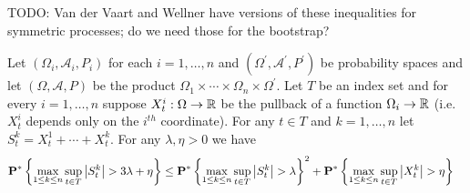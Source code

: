 TODO: Van der Vaart and Wellner have versions of these inequalities for symmetric processes; do we need those for the bootstrap?
\begin{lem}\label{HoffmanJorgensenInequalities}Let $(\Omega_i,\mathcal{A}_i, P_i)$ for each $i=1, \dotsc, n$ and $(\Omega^\prime, \mathcal{A}^\prime, P^\prime)$ be probability spaces and let $(\Omega, \mathcal{A}, P)$ be the product $\Omega_1 \times \dotsb \times \Omega_n \times \Omega^\prime$.  Let $T$ be an index set and for every $i=1, \dotsc, n$ suppose $X^i_t : \Omega \to \mathbb{R}$ be the pullback of a function $\Omega_i \to \mathbb{R}$ (i.e. $X^i_t$ depends only on the $i^{th}$ coordinate).  For any $t \in T$ and $k=1, \dotsc, n$ let $S^k_t = X^1_t + \dotsb + X^k_t$.  For any $\lambda,\eta>0$ we have
\begin{align*}
\textbf{P}^* \left \{\max_{1 \leq k \leq n} \sup_{t \in T} \left \vert S^k_t \right \vert > 3\lambda + \eta \right \} 
&\leq \textbf{P}^* \left \{\max_{1 \leq k \leq n} \sup_{t \in T} \left \vert S^k_t \right \vert > \lambda \right \}^2 + \textbf{P}^* \left \{\max_{1 \leq k \leq n} \sup_{t \in T} \left \vert X^k_t \right \vert > \eta \right \}
\end{align*}
\end{lem}
